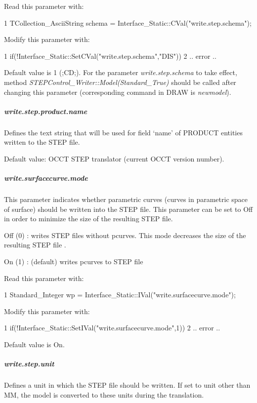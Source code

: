 Read this parameter with\+: 
\begin{DoxyCode}
1 TCollection\_AsciiString schema = Interface\_Static::CVal("write.step.schema"); 
\end{DoxyCode}
 Modify this parameter with\+: 
\begin{DoxyCode}
1 if(!Interface\_Static::SetCVal("write.step.schema","DIS"))  
2 .. error .. 
\end{DoxyCode}
 Default value is 1 (;CD;). For the parameter {\itshape write.\+step.\+schema} to take effect, method {\itshape S\+T\+E\+P\+Control\+\_\+\+Writer\+::\+Model(\+Standard\+\_\+\+True)} should be called after changing this parameter (corresponding command in D\+R\+AW is {\itshape newmodel}).

\subparagraph*{write.\+step.\+product.\+name}

Defines the text string that will be used for field ‘name’ of P\+R\+O\+D\+U\+CT entities written to the S\+T\+EP file.

Default value\+: O\+C\+CT S\+T\+EP translator (current O\+C\+CT version number).

\subparagraph*{write.\+surfacecurve.\+mode}

This parameter indicates whether parametric curves (curves in parametric space of surface) should be written into the S\+T\+EP file. This parameter can be set to Off in order to minimize the size of the resulting S\+T\+EP file.


\begin{DoxyItemize}
\item Off (0) \+: writes S\+T\+EP files without pcurves. This mode decreases the size of the resulting S\+T\+EP file .
\item On (1) \+: (default) writes pcurves to S\+T\+EP file
\end{DoxyItemize}

Read this parameter with\+: 
\begin{DoxyCode}
1 Standard\_Integer wp = Interface\_Static::IVal("write.surfacecurve.mode"); 
\end{DoxyCode}
 Modify this parameter with\+: 
\begin{DoxyCode}
1 if(!Interface\_Static::SetIVal("write.surfacecurve.mode",1))  
2 .. error .. 
\end{DoxyCode}
 Default value is On.

\subparagraph*{write.\+step.\+unit}

Defines a unit in which the S\+T\+EP file should be written. If set to unit other than MM, the model is converted to these units during the translation.


